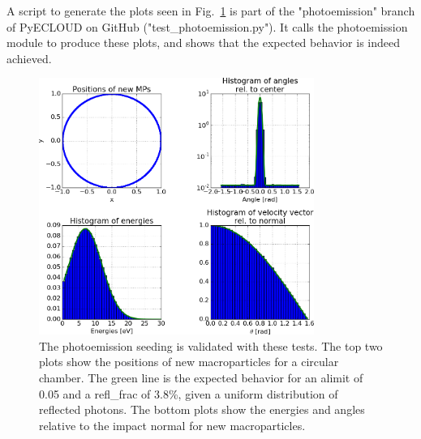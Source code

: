 A script to generate the plots seen in Fig.~\ref{fig:test_module} is part of the "photoemission" branch of PyECLOUD on GitHub ("test\_photoemission.py").
It calls the photoemission module to produce these plots, and shows that the expected behavior is indeed achieved.
\begin{figure}[tbh]
    \centering
    \includegraphics[width=0.8\textwidth]{../plots/test_module.png}
    \caption{
        The photoemission seeding is validated with these tests.
        The top two plots show the positions of new macroparticles for a circular chamber.
        The green line is the expected behavior for an alimit of 0.05 and a refl\_frac of 3.8\%, given a uniform distribution of reflected photons.
        The bottom plots show the energies and angles relative to the impact normal for new macroparticles.
    }
    \label{fig:test_module}
\end{figure}

